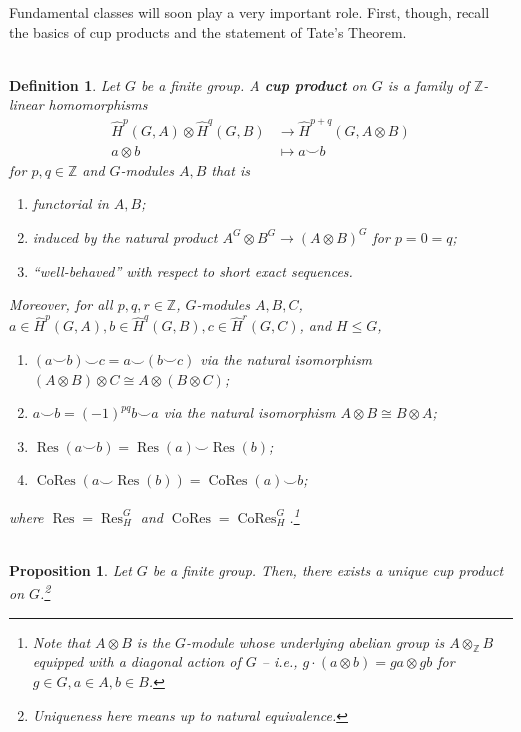 \documentclass[11pt]{article}
\newcommand{\Z}{\mathbb{Z}}
\newcommand{\iso}{\cong}
\newcommand{\tensor}{\otimes}
\DeclareMathOperator{\CoRes}{CoRes} %
\DeclareMathOperator{\Res}{Res} %
\newenvironment{enum}[1]{
\begin{enumerate}[label=\textup{({#1*})}]
}
{
\end{enumerate}
}
\newtheorem*{definition*}{\\Definition}
\newtheorem*{proposition*}{\\Proposition}
\begin{document}
Fundamental classes will soon play a very important role. First, though, recall the basics of cup products and the statement of Tate's Theorem.

\begin{definition*}
Let $G$ be a finite group. A \textbf{cup product} on $G$ is a family of $\Z$-linear homomorphisms
\begin{align*}
\hat{H}^p(G,A)\tensor\hat{H}^q(G,B)&\to\hat{H}^{p+q}(G,A\tensor B) \\
a\tensor b&\mapsto a\smile b
\end{align*}
for $p,q\in\Z$ and $G$-modules $A,B$ that is
\begin{enum}{\roman}
\item functorial in $A,B$;
\item induced by the natural product $A^G\tensor B^G\to(A\tensor B)^G$ for $p=0=q$;
\item ``well-behaved'' with respect to short exact sequences.
\end{enum}
Moreover, for all $p,q,r\in\Z$, $G$-modules $A,B,C$, $a\in\hat{H}^p(G,A),b\in\hat{H}^q(G,B),c\in\hat{H}^r(G,C)$, and $H\leq G$,
\begin{enum}{\roman}
\item $(a\smile b)\smile c=a\smile(b\smile c)$ via the natural isomorphism $(A\tensor B)\tensor C\iso A\tensor(B\tensor C)$;
\item $a\smile b=(-1)^{pq}b\smile a$ via the natural isomorphism $A\tensor B\iso B\tensor A$;
\item $\Res(a\smile b)=\Res(a)\smile\Res(b)$;
\item $\CoRes(a\smile\Res(b))=\CoRes(a)\smile b$;
\end{enum}
where $\Res=\Res_H^G$ and $\CoRes=\CoRes_H^G$.\footnote{Note that $A\tensor B$ is the $G$-module whose underlying abelian group is $A\tensor_{\Z}B$ equipped with a diagonal action of $G$ -- i.e., $g\cdot(a\tensor b)=ga\tensor gb$ for $g\in G,a\in A,b\in B$.}
\end{definition*}

\begin{proposition*}
Let $G$ be a finite group. Then, there exists a unique cup product on $G$.\footnote{Uniqueness here means up to natural equivalence.}
\end{proposition*}
\end{document}
